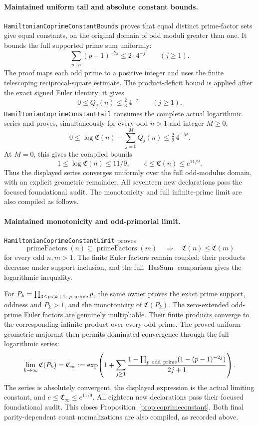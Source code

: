\paragraph{Maintained uniform tail and absolute constant bounds.}
\texttt{HamiltonianCoprimeConstantBounds} proves that equal
distinct prime-factor sets give equal constants, on the
original domain of odd moduli greater than one.
It bounds the full supported prime sum uniformly:
\[
 \sum_{p\mid n}(p-1)^{-2j}\leq2\cdot4^{-j}
                       \qquad(j\geq1).
\]
The proof maps each odd prime to a positive integer and uses
the finite telescoping reciprocal-square estimate.
The product-deficit bound is applied after the exact signed
Euler identity; it gives
\[
 0\leq Q_j(n)\leq\tfrac23\,4^{-j}\qquad(j\geq1).
\]
\texttt{HamiltonianCoprimeConstantTail} consumes the complete
actual logarithmic series and proves, simultaneously for
every odd \(n>1\) and integer \(M\geq0\),
\[
 0\leq\log\mathfrak C(n)-\sum_{j=0}^{M}Q_j(n)
                         \leq\tfrac29\,4^{-M}.
\]
At \(M=0\), this gives the compiled bounds
\[
 1\leq\log\mathfrak C(n)\leq11/9,\qquad
 e\leq\mathfrak C(n)\leq e^{11/9}.
\]
Thus the displayed series converges uniformly over the full
odd-modulus domain, with an explicit geometric remainder.
All seventeen new declarations pass the focused foundational
audit. The monotonicity and full infinite-prime limit are also
compiled as follows.

\paragraph{Maintained monotonicity and odd-primorial limit.}
\texttt{HamiltonianCoprimeConstantLimit} proves
\[
 \operatorname{primeFactors}(n)\subseteq
 \operatorname{primeFactors}(m)
 \quad\Longrightarrow\quad
 \mathfrak C(n)\leq\mathfrak C(m)
\]
for every odd \(n,m>1\).
The finite Euler factors remain coupled; their products
decrease under support inclusion, and the full
\(\operatorname{HasSum}\) comparison gives the logarithmic inequality.

For \(P_k=\prod_{3\leq p<k+4,\ p\ {\rm prime}}p\), the
same owner proves the exact prime support, oddness and
\(P_k>1\), and the monotonicity of \(\mathfrak C(P_k)\).
The zero-extended odd-prime Euler factors are genuinely
multipliable. Their finite products converge to the
corresponding infinite product over every odd prime.
The proved uniform geometric majorant then permits
dominated convergence through the full logarithmic series:
\[
 \lim_{k\to\infty}\mathfrak C(P_k)
  =\mathfrak C_\infty
  :=\exp\!\left(1+\sum_{j\geq1}
       \frac{1-\prod_{p\ {\rm odd\ prime}}
               (1-(p-1)^{-2j})}{2j+1}\right).
\]
The series is absolutely convergent, the displayed expression
is the actual limiting constant, and
\(e\leq\mathfrak C_\infty\leq e^{11/9}\).
All eighteen new declarations pass their focused foundational
audit. This closes Proposition~\ref{prop:coprimeconstant}.
Both final parity-dependent count normalizations are also
compiled, as recorded above.


